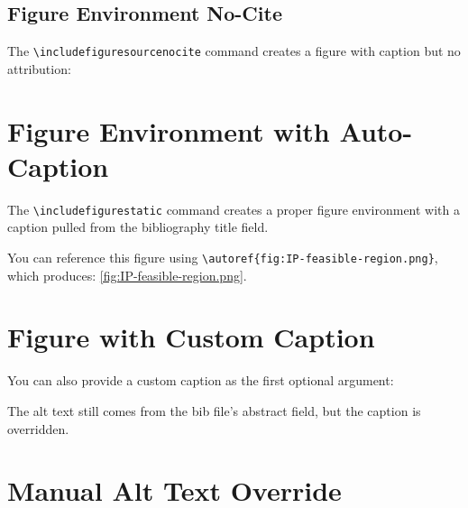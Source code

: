 \documentclass[12pt,letterpaper]{article}
\begin{document}
\subsection{Figure Environment No-Cite}

The \verb|\includefiguresourcenocite| command creates a figure with caption but no attribution:


\section{Figure Environment with Auto-Caption}

The \verb|\includefigurestatic| command creates a proper figure environment with
a caption pulled from the bibliography title field.


You can reference this figure using \verb|\autoref{fig:IP-feasible-region.png}|,
which produces: \autoref{fig:IP-feasible-region.png}.

\section{Figure with Custom Caption}

You can also provide a custom caption as the first optional argument:


The alt text still comes from the bib file's abstract field, but the caption
is overridden.

\section{Manual Alt Text Override}
\end{document}
